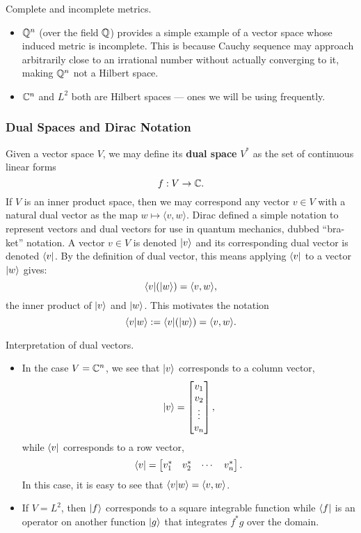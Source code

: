 \begin{example} Complete and incomplete metrics.
    \begin{itemize}
        \item $\mathbb{Q}^n$ (over the field $\mathbb{Q}$) provides a simple example of a vector space whose induced metric is incomplete. This is because Cauchy sequence may approach arbitrarily close to an irrational number without actually converging to it, making $\mathbb{Q}^n$ not a Hilbert space.
        \item $\mathbb{C}^n$ and $L^2$ both are Hilbert spaces --- ones we will be using frequently.
    \end{itemize}  
\end{example}

\subsubsection{Dual Spaces and Dirac Notation}
Given a vector space $V$, we may define its \textbf{dual space} $V^*$ as the set of continuous linear forms $$f : V \to \mathbb{C}.$$ If $V$ is an inner product space, then we may correspond any vector $v\in V$ with a natural dual vector as the map 
$w\mapsto \langle v, w \rangle.$
Dirac defined a simple notation to represent vectors and dual vectors for use in quantum mechanics, dubbed ``bra-ket'' notation. A vector $v\in V$ is denoted $\lvert v \rangle$ and its corresponding dual vector is denoted $\langle v \rvert$. By the definition of dual vector, this means applying $\langle v \rvert$ to a vector $\lvert w \rangle$ gives:
$$\langle v \rvert(\lvert w \rangle) = \langle v, w \rangle,$$
the inner product of $\lvert v \rangle$ and $\lvert w \rangle$. This motivates the notation
$$\langle v\vert w \rangle := \langle v \rvert(\lvert w \rangle) = \langle v, w \rangle.$$

\begin{example} Interpretation of dual vectors.
    \begin{itemize}
        \item In the case $V = \mathbb{C}^n$, we see that $\lvert v \rangle$ corresponds to a column vector,
        $$\lvert v \rangle = \begin{bmatrix}
            v_1 \\ v_2 \\ \vdots \\ v_n
        \end{bmatrix},$$
        while $\langle v \rvert$ corresponds to a row vector,
        $$\langle v \rvert = \begin{bmatrix}
            v_1^* & v_2^* & \cdots & v_n^*
        \end{bmatrix}.$$
        In this case, it is easy to see that $\langle v\vert w \rangle = \langle v, w \rangle$.
    
        \item If $V = L^2$, then $\lvert f \rangle$ corresponds to a square integrable function while
        $\langle f \rvert$ is an operator on another function $\lvert g \rangle$ that integrates $f^* g$ over the domain.
    \end{itemize}
\end{example}

